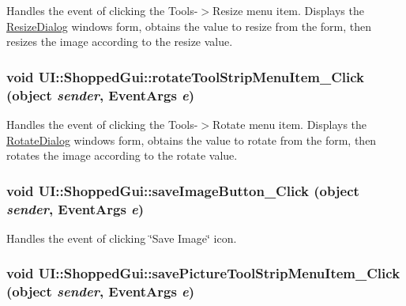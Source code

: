 \label{class_u_i_1_1_shopped_gui_a05e2b57477f10f88b1ee06b6b5aa4d86}
Handles the event of clicking the Tools-\/$>$Resize menu item. Displays the \hyperlink{class_u_i_1_1_resize_dialog}{ResizeDialog} windows form, obtains the value to resize from the form, then resizes the image according to the resize value. \hypertarget{class_u_i_1_1_shopped_gui_a8b4824c0552bcfe814bbf8437cb87ec2}{
\subsubsection[{rotateToolStripMenuItem\_\-Click}]{\setlength{\rightskip}{0pt plus 5cm}void UI::ShoppedGui::rotateToolStripMenuItem\_\-Click (object {\em sender}, \/  EventArgs {\em e})}}
\label{class_u_i_1_1_shopped_gui_a8b4824c0552bcfe814bbf8437cb87ec2}
Handles the event of clicking the Tools-\/$>$Rotate menu item. Displays the \hyperlink{class_u_i_1_1_rotate_dialog}{RotateDialog} windows form, obtains the value to rotate from the form, then rotates the image according to the rotate value. \hypertarget{class_u_i_1_1_shopped_gui_a205444f0fff14792394724b4eb22601d}{
\subsubsection[{saveImageButton\_\-Click}]{\setlength{\rightskip}{0pt plus 5cm}void UI::ShoppedGui::saveImageButton\_\-Click (object {\em sender}, \/  EventArgs {\em e})}}
\label{class_u_i_1_1_shopped_gui_a205444f0fff14792394724b4eb22601d}
Handles the event of clicking \char`\"{}Save Image\char`\"{} icon. \hypertarget{class_u_i_1_1_shopped_gui_a79d60e553769283f7b9ec8af7a9d3dc1}{
\subsubsection[{savePictureToolStripMenuItem\_\-Click}]{\setlength{\rightskip}{0pt plus 5cm}void UI::ShoppedGui::savePictureToolStripMenuItem\_\-Click (object {\em sender}, \/  EventArgs {\em e})}}
